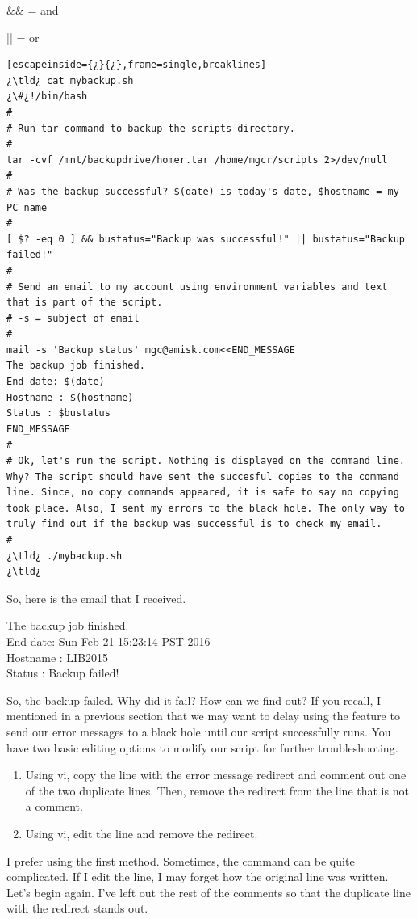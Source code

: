 \&\& = and

|| = or

\begin{lstlisting}[escapeinside={¿}{¿},frame=single,breaklines]
¿\tld¿ cat mybackup.sh
¿\#¿!/bin/bash
#
# Run tar command to backup the scripts directory.
#
tar -cvf /mnt/backupdrive/homer.tar /home/mgcr/scripts 2>/dev/null
#
# Was the backup successful? $(date) is today's date, $hostname = my PC name
#
[ $? -eq 0 ] && bustatus="Backup was successful!" || bustatus="Backup failed!"
#
# Send an email to my account using environment variables and text that is part of the script.
# -s = subject of email
#
mail -s 'Backup status' mgc@amisk.com<<END_MESSAGE
The backup job finished.
End date: $(date)
Hostname : $(hostname)
Status : $bustatus
END_MESSAGE
#
# Ok, let's run the script. Nothing is displayed on the command line. Why? The script should have sent the succesful copies to the command line. Since, no copy commands appeared, it is safe to say no copying took place. Also, I sent my errors to the black hole. The only way to truly find out if the backup was successful is to check my email. 
#
¿\tld¿ ./mybackup.sh
¿\tld¿
\end{lstlisting}

So, here is the email that I received.

The backup job finished.\\
End date: Sun Feb 21 15:23:14 PST 2016\\
Hostname : LIB2015\\
Status : Backup failed!

So, the backup failed. Why did it fail? How can we find out? If you recall, I mentioned in a previous section that we may want to delay using the feature to send our error messages to a black hole until our script successfully runs. You have two basic editing options to modify our script for further troubleshooting.

\begin{enumerate}
	\item{Using vi, copy the line with the error message redirect and comment out one of the two duplicate lines. Then, remove the redirect from the line that is not a comment.}
	\item{Using vi, edit the line and remove the redirect.}
\end{enumerate}

I prefer using the first method. Sometimes, the command can be quite complicated. If I edit the line, I may forget how the original line was written. Let's begin again. I've left out the rest of the comments so that the duplicate line with the redirect stands out.

